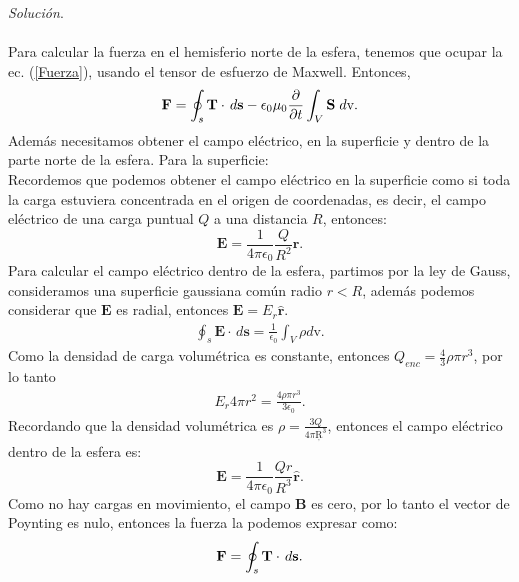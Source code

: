 \documentclass[11pt,fleqn]{book} %
\begin{document}
\begin{example}
\emph{Soluci\'on}.
\\\\Para calcular la fuerza en el hemisferio norte de la esfera, tenemos que ocupar la ec. (\ref{Fuerza}), usando el tensor de esfuerzo de Maxwell. Entonces,
\begin{eqnarray*}
\textbf{F}=\oint_{s}\textbf{T}\cdot\hspace{0.5mm} d\textbf{s}-\epsilon_{0}\mu_{0}\frac{\partial}{\partial t}\int_{V} \textbf{S}\hspace{1mm} d\text{v}.
\end{eqnarray*}
Adem\'as necesitamos obtener el campo el\'ectrico, en la superficie y dentro de la parte norte de la esfera. Para la superficie:\\
Recordemos que podemos obtener el campo el\'ectrico en la superficie como si toda la carga estuviera concentrada en el origen de coordenadas, es decir, el campo el\'ectrico de una carga puntual $Q$ a una distancia $R$, entonces:
\begin{equation}
\textbf{E}=\frac{1}{4\pi\epsilon_{0}}\frac{Q}{R^{2}}\hat{\textbf{r}}.
\end{equation}
Para calcular el campo el\'ectrico dentro de la esfera, partimos por la ley de Gauss, consideramos una superficie gaussiana com\'un radio $r<R$, adem\'as podemos considerar que $\textbf{E}$ es radial, entonces $\textbf{E}=E_{r}\hat{\textbf{r}}$.
\begin{eqnarray*}
\oint_{s} \textbf{E}\cdot\,d\textbf{s}=\frac{1}{\epsilon_{0}}\int_{V}\rho d\text{v}.
\end{eqnarray*}
Como la densidad de carga volum\'etrica es constante, entonces $Q_{enc}=\frac{4}{3}\rho \pi r^{3}$, por lo tanto
\begin{eqnarray*}
E_{r}4\pi r^{2}=\frac{4\rho \pi r^{3}}{3\epsilon_{0}}.
\end{eqnarray*}
 Recordando que la densidad volum\'etrica es $\rho=\frac{3Q}{4 \pi  Ŗ^{3}}$, entonces el campo el\'ectrico dentro de la esfera es:
\begin{equation}
 \textbf{E}=\frac{1}{4 \pi \epsilon_{0}}\frac{Qr}{R^{3}}\hat{\textbf{r}}.
\end{equation}
Como no hay cargas en movimiento, el campo $\textbf{B}$ es cero, por lo tanto el vector de Poynting es nulo, entonces la fuerza la podemos expresar como:
\begin{equation}
\textbf{F}=\oint_{s}\textbf{T}\cdot\hspace{0.5mm} d\textbf{s}. \label{Fuerza-tensor}

\end{equation}
\end{example}
\end{document}
